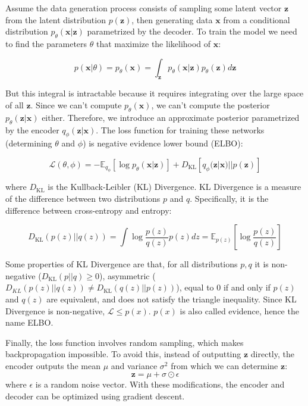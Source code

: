 \documentclass{article}
\begin{document}
Assume the data generation process consists of sampling some latent vector \(\mathbf{z}\) from the latent distribution $p(\mathbf{z})$, then generating data \(\mathbf{x}\) from a conditional distribution $p_{\theta}(\mathbf{x}|\mathbf{z})$ parametrized by the decoder. To train the model we need to find the parameters $\theta$ that maximize the likelihood of \(\mathbf{x}\):

\[p(\mathbf{x}|\theta) = p_{\theta}(\mathbf{x}) = \displaystyle\int_{\mathbf{z}}^{}p_{\theta}(\mathbf{x}|\mathbf{z})p_{\theta}(\mathbf{z})d\mathbf{z}\] 

But this integral is intractable because it requires integrating over the large space of all $\mathbf{z}$. Since we can't compute $p_{\theta}(\mathbf{x})$, we can't compute the posterior $p_{\theta}(\mathbf{z}|\mathbf{x})$ either. Therefore, we introduce an approximate posterior parametrized by the encoder $q_{\phi}(\mathbf{z}|\mathbf{x})$. The loss function for training these networks (determining $\theta$ and $\phi$) is negative evidence lower bound (ELBO):

\[\mathcal{L}(\theta, \phi) = -\mathbb{E}_{q_{\phi}}[\log p_{\theta}(\mathbf{x}|\mathbf{z})] + D_{\text{KL}}[q_{\phi}(\mathbf{z}|\mathbf{x})||p(\mathbf{z})]\]

where $D_{\text{KL}}$ is the Kullback-Leibler (KL) Divergence. KL Divergence is a measure of the difference between two distributions \(p\) and \(q\). Specifically, it is the difference between cross-entropy and entropy:

\[D_{\text{KL}}(p(z)||q(z)) = \displaystyle\int\log\displaystyle\frac{p(z)}{q(z)}p(z)dz = \mathbb{E}_{p(z)}\left[\log\displaystyle\frac{p(z)}{q(z)}\right]\]

Some properties of KL Divergence are that, for all distributions \(p,q\) it is non-negative (\(D_{\text{KL}}(p||q) \ge 0\)), asymmetric (\(D_{KL}(p(z)||q(z)) \ne D_{\text{KL}}(q(z)||p(z))\)), equal to \(0\) if and only if \(p(z)\) and \(q(z)\) are equivalent, and does not satisfy the triangle inequality. Since KL Divergence is non-negative, \(\mathcal{L} \le p(x)\). \(p(x)\) is also called evidence, hence the name ELBO. 

Finally, the loss function involves random sampling, which makes backpropagation impossible. To avoid this, instead of outputting $\mathbf{z}$ directly, the encoder outputs the mean $\mu$ and variance $\sigma^2$ from which we can determine $\mathbf{z}$:
\[\mathbf{z} = \mu + \sigma \odot \epsilon\]
where $\epsilon$ is a random noise vector. With these modifications, the encoder and decoder can be optimized using gradient descent.
\end{document}
